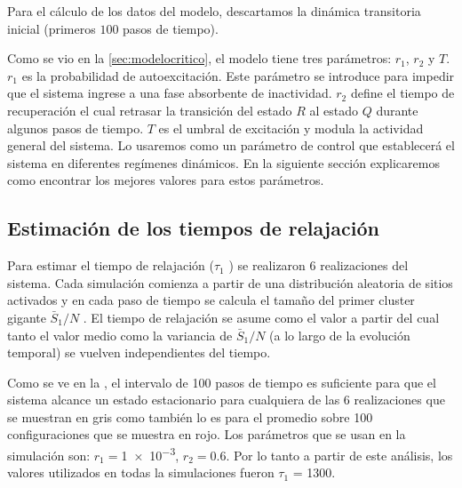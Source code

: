 Para el cálculo de los datos del modelo, descartamos la dinámica transitoria inicial (primeros $100$ pasos de tiempo).


Como se vio en la \cref{sec:modelocritico}, el modelo tiene tres parámetros: $r_1$, $r_2$ y $T$. $r_1$ es la probabilidad de autoexcitación. Este parámetro se introduce para impedir que el sistema ingrese a una fase absorbente de inactividad. $r_2$ define el tiempo de recuperación el cual retrasar la transición del estado $R$ al estado $Q$ durante algunos pasos de tiempo. $T$ es el umbral de excitación y modula la actividad general del sistema. Lo usaremos como un parámetro de control que establecerá el sistema en diferentes regímenes dinámicos. En la siguiente sección explicaremos como encontrar los mejores valores para estos parámetros.

\subsection{Estimación de los tiempos de relajación }

Para estimar el tiempo de relajación ($\tau_1$ ) se realizaron 6 realizaciones del sistema. Cada simulación comienza a partir de una distribución aleatoria de sitios activados y en cada paso de tiempo se calcula el tamaño del primer cluster gigante $\bar{S}_1/N$ . El tiempo de relajación se asume como el valor a partir del cual tanto el valor medio como la variancia de $\bar{S}_1/N$ (a lo largo de la evolución temporal) se vuelven independientes del tiempo. 

Como se ve en la , el intervalo de 100 pasos de tiempo es suficiente para que el sistema alcance un estado estacionario para cualquiera de las 6 realizaciones que se muestran en gris como también lo es para el promedio sobre 100 configuraciones que se muestra en rojo. Los parámetros que se usan en la simulación
son: $r_1=$\num{1e-3}, $r_2 = 0.6$.   Por lo tanto a partir de este análisis, los valores utilizados en todas la simulaciones  fueron $\tau_1$ = 1300.


